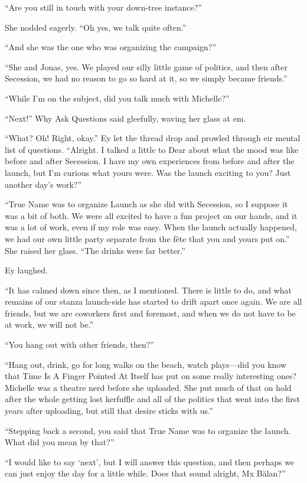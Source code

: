 ``Are you still in touch with your down-tree instance?''

She nodded eagerly. ``Oh yes, we talk quite often.''

``And she was the one who was organizing the campaign?''

``She and Jonas, yes. We played our silly little game of politics, and then after Secession, we had no reason to go so hard at it, so we simply became friends.''

``While I'm on the subject, did you talk much with Michelle?''

``Next!'' Why Ask Questions said gleefully, waving her glass at em.

``What? Oh! Right, okay.'' Ey let the thread drop and prowled through eir mental list of questions. ``Alright. I talked a little to Dear about what the mood was like before and after Secession. I have my own experiences from before and after the launch, but I'm curious what yours were. Was the launch exciting to you? Just another day's work?''

``True Name was to organize Launch as she did with Secession, so I suppose it was a bit of both. We were all excited to have a fun project on our hands, and it was a lot of work, even if my role was easy. When the launch actually happened, we had our own little party separate from the fête that you and yours put on.'' She raised her glass. ``The drinks were far better.''

Ey laughed.

``It has calmed down since then, as I mentioned. There is little to do, and what remains of our stanza launch-side has started to drift apart once again. We are all friends, but we are coworkers first and foremost, and when we do not have to be at work, we will not be.''

``You hang out with other friends, then?''

``Hang out, drink, go for long walks on the beach, watch plays---did you know that Time Is A Finger Pointed At Itself has put on some really interesting ones? Michelle was a theatre nerd before she uploaded. She put much of that on hold after the whole getting lost kerfuffle and all of the politics that went into the first years after uploading, but still that desire sticks with us.''

``Stepping back a second, you said that True Name was to organize the launch. What did you mean by that?''

``I would like to say `next', but I will answer this question, and then perhaps we can just enjoy the day for a little while. Does that sound alright, Mx Bălan?''

